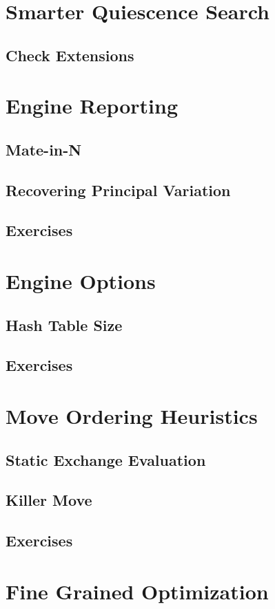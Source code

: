 \documentclass{article}
\begin{document}
\section{Smarter Quiescence Search}
\subsection{Check Extensions}

\section{Engine Reporting}
\subsection{Mate-in-N}
\subsection{Recovering Principal Variation}
\subsection{Exercises}

\section{Engine Options}
\subsection{Hash Table Size}
\subsection{Exercises}
\section{Move Ordering Heuristics}
\subsection{Static Exchange Evaluation}
\subsection{Killer Move}
\subsection{Exercises}
\section{Fine Grained Optimization}
\end{document}
